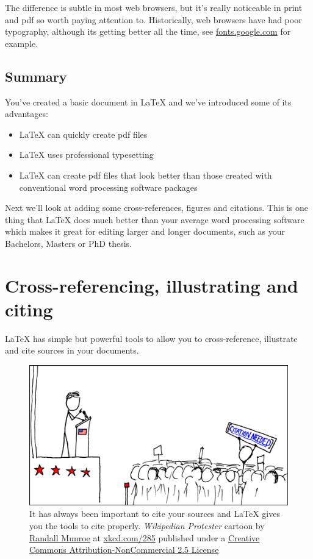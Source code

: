\documentclass[
]{book}
\providecommand{\tightlist}{%
  \setlength{\itemsep}{0pt}\setlength{\parskip}{0pt}}
\begin{document}
The difference is subtle in most web browsers, but it's really noticeable in print and pdf so worth paying attention to. Historically, web browsers have had poor typography, although its getting better all the time, see \href{https://fonts.google.com/}{fonts.google.com} for example.

\hypertarget{concsimple}{%
\section{Summary}\label{concsimple}}

You've created a basic document in LaTeX and we've introduced some of its advantages:

\begin{itemize}
\tightlist
\item
  LaTeX can quickly create pdf files
\item
  LaTeX uses professional typesetting
\item
  LaTeX can create pdf files that look better than those created with conventional word processing software packages
\end{itemize}

Next we'll look at adding some cross-references, figures and citations. This is one thing that LaTeX does much better than your average word processing software which makes it great for editing larger and longer documents, such as your Bachelors, Masters or PhD thesis.

\hypertarget{figref}{%
\chapter{Cross-referencing, illustrating and citing}\label{figref}}

LaTeX has simple but powerful tools to allow you to cross-reference, illustrate and cite sources in your documents.

\begin{figure}

{\centering \includegraphics[width=0.7\linewidth]{images/wikipedian_protester} 

}

\caption{It has always been important to cite your sources and LaTeX gives you the tools to cite properly. \emph{Wikipedian Protester} cartoon by \href{https://en.wikipedia.org/wiki/Randall_Munroe}{Randall Munroe} at \href{https://xkcd.com/285/}{xkcd.com/285} published under a \href{https://creativecommons.org/licenses/by-nc/2.5/}{Creative Commons Attribution-NonCommercial 2.5 License}}\label{fig:wikipedian-fig}
\end{figure}
\end{document}
